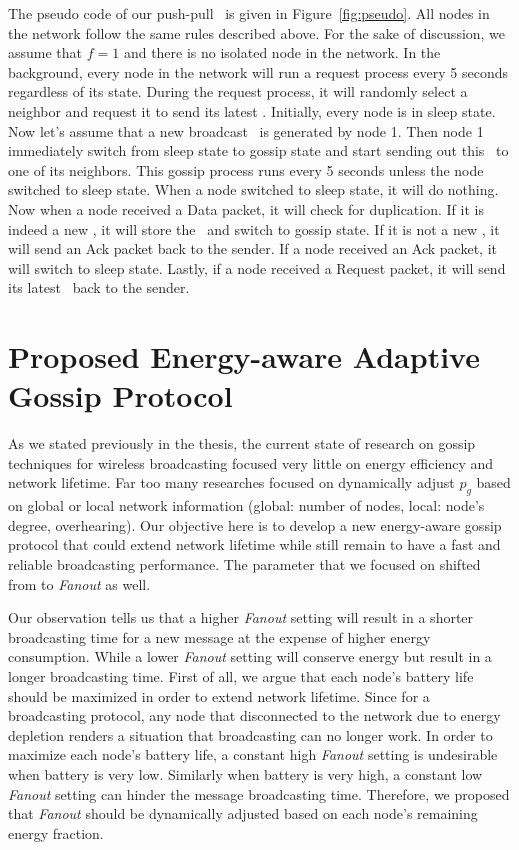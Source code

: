The pseudo code of our push-pull \gp ~is given in Figure~\ref{fig:pseudo}. All nodes in the network follow the same rules described above. For the sake of discussion, we assume that $f=1$ and there is no isolated node in the network. In the background, every node in the network will run a request process every 5 seconds regardless of its state. During the request process, it will randomly select a neighbor and request it to send its latest \msg. Initially, every node is in sleep state. Now let's assume that a new broadcast \msg ~is generated by node 1. Then node 1 immediately switch from sleep state to gossip state and start sending out this \msg ~to one of its neighbors. This gossip process runs every 5 seconds unless the node switched to sleep state. When a node switched to sleep state, it will do nothing. Now when a node received a Data packet, it will check for duplication. If it is indeed a new \msg, it will store the \msg ~and switch to gossip state. If it is not a new \msg, it will send an Ack packet back to the sender. If a node received an Ack packet, it will switch to sleep state. Lastly, if a node received a Request packet, it will send its latest \msg ~back to the sender. 

\section{Proposed Energy-aware Adaptive Gossip Protocol}
As we stated previously in the thesis, the current state of research on gossip techniques for wireless broadcasting focused very little on energy efficiency and network lifetime. Far too many researches focused on dynamically adjust $p_g$ based on global or local network information (global: number of nodes, local: node's degree, overhearing). Our objective here is to develop a new energy-aware gossip protocol that could extend network lifetime while still remain to have a fast and reliable broadcasting performance. The parameter that we focused on shifted from \emph{\pog} to \emph{Fanout} as well. 

Our observation tells us that a higher \emph{Fanout} setting will result in a shorter broadcasting time for a new message at the expense of higher energy consumption. While a lower \emph{Fanout} setting will conserve energy but result in a longer broadcasting time. First of all, we argue that each node's battery life should be maximized in order to extend network lifetime. Since for a broadcasting protocol, any node that disconnected to the network due to energy depletion renders a situation that broadcasting can no longer work. In order to maximize each node's battery life, a constant high \emph{Fanout} setting is undesirable when battery is very low. Similarly when battery is very high, a constant low \emph{Fanout} setting can hinder the message broadcasting time. Therefore, we proposed that \emph{Fanout} should be dynamically adjusted based on each node's remaining energy fraction. 

